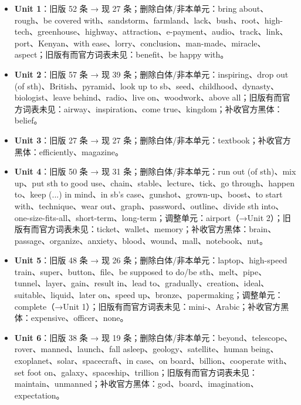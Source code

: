 \documentclass[UTF8,a4paper,11pt,oneside]{ctexbook}
\begin{document}
\par\addvspace{0.75em}\par
\vspace{0.12em}\noindent{\color{rulelight}\rule{\linewidth}{0.55pt}}\par
\addvspace{0.2em}
\begin{itemize}[leftmargin=2.2em,itemsep=0.25ex,topsep=0.3ex,label={\textcolor{mainblue}{\small\textbullet}}]
\item \textbf{\textcolor{mainblue}{Unit 1}}：旧版 52 条 → 现 27 条；删除白体/非本单元：bring about、rough、be covered with、sandstorm、farmland、lack、bush、root、high-tech、greenhouse、highway、attraction、e-payment、audio、track、link、port、Kenyan、with ease、lorry、conclusion、man-made、miracle、aspect；旧版有而官方词表未见：benefit、be happy with。
\item \textbf{\textcolor{mainblue}{Unit 2}}：旧版 57 条 → 现 39 条；删除白体/非本单元：inspiring、drop out (of sth)、British、pyramid、look up to sb、seed、childhood、dynasty、biologist、leave behind、radio、live on、woodwork、above all；旧版有而官方词表未见：airway、inspiration、come true、kingdom；补收官方黑体：belief。
\item \textbf{\textcolor{mainblue}{Unit 3}}：旧版 27 条 → 现 27 条；删除白体/非本单元：textbook；补收官方黑体：efficiently、magazine。
\item \textbf{\textcolor{mainblue}{Unit 4}}：旧版 50 条 → 现 31 条；删除白体/非本单元：run out (of sth)、mix up、put sth to good use、chain、stable、lecture、tick、go through、happen to、keep (...) in mind、in sb's case、gunshot、grown-up、boost、to start with、technique、wear out、graph、password、outline、divide sth into、one-size-fits-all、short-term、long-term；调整单元：airport（→Unit 2）；旧版有而官方词表未见：ticket、wallet、memory；补收官方黑体：brain、passage、organize、anxiety、blood、wound、mall、notebook、nut。
\item \textbf{\textcolor{mainblue}{Unit 5}}：旧版 48 条 → 现 26 条；删除白体/非本单元：laptop、high-speed train、super、button、file、be supposed to do/be sth、melt、pipe、tunnel、layer、gain、result in、lead to、gradually、creation、ideal、suitable、liquid、later on、speed up、bronze、papermaking；调整单元：complete（→Unit 1）；旧版有而官方词表未见：mini-、Arabic；补收官方黑体：expensive、officer、none。
\item \textbf{\textcolor{mainblue}{Unit 6}}：旧版 38 条 → 现 19 条；删除白体/非本单元：beyond、telescope、rover、manned、launch、fall asleep、geology、satellite、human being、exoplanet、solar、spacecraft、in case、on board、billion、cooperate with、set foot on、galaxy、spaceship、trillion；旧版有而官方词表未见：maintain、unmanned；补收官方黑体：god、board、imagination、expectation。

\end{itemize}
\end{document}
